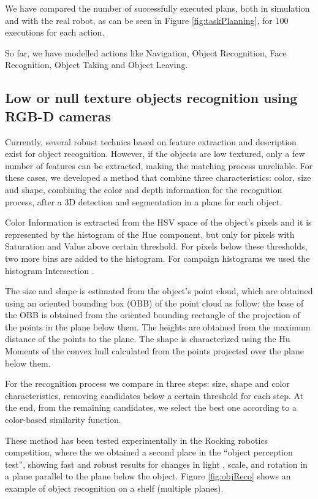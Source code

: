 \documentclass{llncs}
\begin{document}
We have compared the number of successfully executed plans, both in simulation and with the real robot, as can be seen in Figure \ref{fig:taskPlanning}, for 100 executions for each action.

So far, we have modelled actions like Navigation, Object Recognition, Face Recognition, Object Taking and Object Leaving.

\subsection{Low or null texture objects recognition using RGB-D cameras}\label{subsec:objDet}

Currently, several robust technics based on feature extraction and description exist for object recognition. However, if the objects are low textured, only a few number of features can be extracted, making the matching process unreliable. For these cases, we developed a method that combine three characteristics: color, size and shape, combining the color and depth information for the recognition process, after a 3D detection and segmentation in a plane for each object.

Color Information is extracted from the HSV space of the object's pixels and it is represented by the histogram of the Hue component, but only for pixels with Saturation and Value above certain threshold. For pixels below these thresholds, two more bins are added to the histogram. For campaign histograms we used the histogram Intersection \cite{swain1991_HistoInter}.

The size and shape is estimated from the object's point cloud, which are obtained using an oriented bounding box (OBB) of the point cloud as follow: the base of the OBB is obtained from the oriented bounding rectangle of the projection of the points in the plane below them. The heights are obtained from the maximum distance of the points to the plane. The shape is characterized using the Hu Moments \cite{hu1962_moments} of the convex hull calculated from the points projected over the plane below them. 

For the recognition process we compare in three steps: size, shape and color characteristics, removing candidates below a certain threshold for each step. At the end, from the remaining candidates, we select the best one according to a color-based similarity function. 

These method has been tested experimentally in the Rocking robotics competition, where the we obtained a second place in the ``object perception test'', showing fast and robust results for changes in light , scale, and rotation in a plane parallel to the plane below the object. Figure \ref{fig:objReco} shows an example of object recognition on a shelf (multiple planes).
\end{document}
